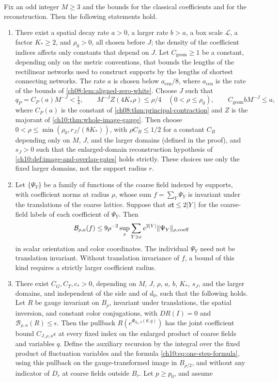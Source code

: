 \begin{theorem}\label{ch10:thm:common-analytic-class}
Fix an odd integer $M\ge3$ and the bounds for the classical coefficients and for the reconstruction. Then the following statements hold.
\begin{enumerate}
\item There exist a spatial decay rate $a>0$, a larger rate $b>a$, a box scale $\mathscr L$, a factor $K_*\ge2$, and $\rho_0>0$, all chosen before $J$; the density of the coefficient indices affects only constants that depend on $J$. Let $C_{\mathrm{geom}}\ge1$ be a constant, depending only on the metric conventions, that bounds the lengths of the rectilinear networks used to construct supports by the lengths of shortest connecting networks. The rate $a$ is chosen below $a_{\mathrm{cen}}/8$, where $a_{\mathrm{cen}}$ is the rate of the bounds of \cref{ch08:lem:aligned-zero-white}. Choose $J$ such that
\[
 q_P=C_P(a)M^{-J}<\tfrac14,\qquad M^{-J}Z(4K_*\rho)\le\rho/4\quad(0<\rho\le\rho_0),\qquad C_{\mathrm{geom}}bM^{-J}\le a,
\]
where $C_P(a)$ is the constant of \cref{ch08:thm:principal-contraction} and $Z$ is the majorant of \cref{ch10:thm:whole-image-gauge}. Then choose $0<\rho\le\min(\rho_0,r_J/(8K_*))$, with $\rho C_B\le1/2$ for a constant $C_B$ depending only on $M$, $J$, and the larger domains (defined in the proof), and $s_J>0$ such that the enlarged-domain reconstruction hypothesis of \cref{ch10:def:image-and-overlap-gates} holds strictly. These choices use only the fixed larger domains, not the support radius $r$.
\item Let $\{\Psi_Y\}$ be a family of functions of the coarse field indexed by supports, with coefficient norms at radius $\rho$, whose sum $f=\sum_Y\Psi_Y$ is invariant under the translations of the coarse lattice. Suppose that $a\mathsf t\le2\lvert Y\rvert$ for the coarse-field labels of each coefficient of $\Psi_Y$. Then
\[
 \mathcal B_{\rho,a}(f)\le9\rho^{-2}\sup_x\sum_{Y\ni x}e^{2\lvert Y\rvert}\lVert \Psi_Y\rVert_{\rho,\mathrm{coeff}}
\]
in scalar orientation and color coordinates. The individual $\Psi_Y$ need not be translation invariant. Without translation invariance of $f$, a bound of this kind requires a strictly larger coefficient radius.
\item There exist $C_G,C_T,c_*>0$, depending on $M$, $J$, $\rho$, $a$, $b$, $K_*$, $s_J$, and the larger domains, and independent of the side and of $d_0$, such that the following holds. Let $R$ be gauge invariant on $B_\rho$, invariant under translations, the spatial inversion, and constant color conjugations, with $DR(I)=0$ and $\mathcal B_{\rho,a}(R)\le\epsilon$. Then the pullback $R(e^{\Phi_{d_0,J}(\theta,q)})$ has the joint coefficient bound $C_{J,\rho,a}\epsilon$ at every fixed index on the enlarged product of coarse fields and variables $q$. Define the auxiliary recursion by the integral over the fixed product of fluctuation variables and the formula \eqref{ch10:eq:one-step-formula}, using this pullback on the gauge-transformed image in $B_{\rho/2}$, and without any indicator of $D_r$ at coarse fields outside $B_r$. Let $p\ge p_0$, and assume

\end{enumerate}
\end{theorem}
